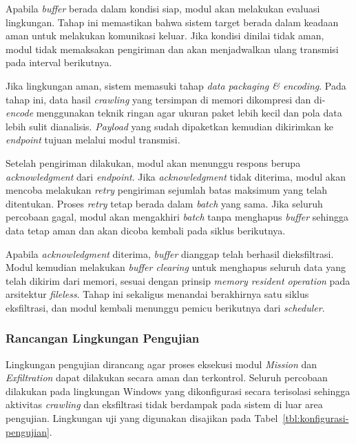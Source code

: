 Apabila \textit{buffer} berada dalam kondisi siap, modul akan melakukan 
evaluasi lingkungan. Tahap ini memastikan bahwa sistem target berada dalam 
keadaan aman untuk melakukan komunikasi keluar. Jika kondisi dinilai tidak 
aman, modul tidak memaksakan pengiriman dan akan menjadwalkan ulang 
transmisi pada interval berikutnya.

Jika lingkungan aman, sistem memasuki tahap 
\textit{data packaging \& encoding}. Pada tahap ini, data hasil 
\textit{crawling} yang tersimpan di memori dikompresi dan di-\textit{encode} 
menggunakan teknik ringan agar ukuran paket lebih kecil dan pola data lebih 
sulit dianalisis. \textit{Payload} yang sudah dipaketkan kemudian dikirimkan 
ke \textit{endpoint} tujuan melalui modul transmisi.

Setelah pengiriman dilakukan, modul akan menunggu respons berupa 
\textit{acknowledgment} dari \textit{endpoint}. Jika 
\textit{acknowledgment} tidak diterima, modul akan mencoba melakukan 
\textit{retry} pengiriman sejumlah batas maksimum yang telah ditentukan. 
Proses \textit{retry} tetap berada dalam \textit{batch} yang sama. Jika 
seluruh percobaan gagal, modul akan mengakhiri \textit{batch} tanpa 
menghapus \textit{buffer} sehingga data tetap aman dan akan dicoba kembali 
pada siklus berikutnya.

Apabila \textit{acknowledgment} diterima, \textit{buffer} dianggap telah 
berhasil dieksfiltrasi. Modul kemudian melakukan \textit{buffer clearing} 
untuk menghapus seluruh data yang telah dikirim dari memori, sesuai dengan 
prinsip \textit{memory resident operation} pada arsitektur \textit{fileless}. 
Tahap ini sekaligus menandai berakhirnya satu siklus eksfiltrasi, dan modul 
kembali menunggu pemicu berikutnya dari \textit{scheduler}.

\subsubsection{Rancangan Lingkungan Pengujian}
\label{subsubsec:lingkungan-pengujian}

Lingkungan pengujian dirancang agar proses eksekusi modul 
\textit{Mission} dan \textit{Exfiltration} dapat dilakukan secara aman 
dan terkontrol. Seluruh percobaan dilakukan pada lingkungan Windows yang 
dikonfigurasi secara terisolasi sehingga aktivitas \textit{crawling} 
dan eksfiltrasi tidak berdampak pada sistem di luar area pengujian. 
Lingkungan uji yang digunakan disajikan pada Tabel~\ref{tbl:konfigurasi-pengujian}.




